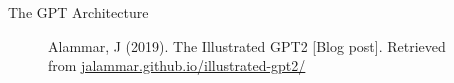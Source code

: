 \documentclass[10pt]{beamer}
\begin{document}
\begin{frame}{The GPT Architecture}
\begin{figure}[h]
\caption{Alammar, J (2019). The Illustrated GPT2 [Blog post]. Retrieved from \href{https://jalammar.github.io/illustrated-gpt2/}{jalammar.github.io/illustrated-gpt2/}
}
\end{figure}

\end{frame}
\end{document}
